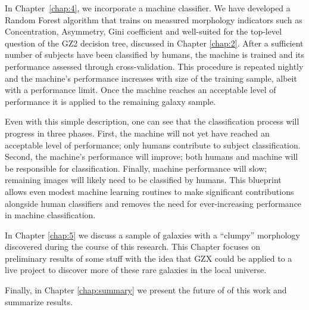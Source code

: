 In Chapter~\ref{chap:4}, we incorporate a machine classifier. We have developed a Random Forest algorithm that trains on measured morphology indicators such as Concentration, Asymmetry, Gini coefficient and  well-suited for the top-level question of the GZ2 decision tree, discussed in Chapter \ref{chap:2}. After a sufficient number of subjects have been classified by humans, the machine is trained and its performance assessed through cross-validation. This procedure is repeated nightly and the machine's performance increases with size of the training sample, albeit with a performance limit. Once the machine reaches an acceptable level of performance it is applied to the remaining galaxy sample. 

Even with this simple description, one can see that the classification process will progress in three phases.  First, the machine will not yet have reached an acceptable level of performance; only humans contribute to subject classification. Second, the machine's performance will improve; both humans and machine will be responsible for classification. Finally, machine performance will slow; remaining images will likely need to be classified by humans. This blueprint allows even modest machine learning routines to make significant contributions alongside human classifiers and removes the need for ever-increasing performance in machine classification.

In Chapter \ref{chap:5} we discuss a sample of galaxies with a ``clumpy'' morphology discovered during the course of this research. This Chapter focuses on preliminary results of some stuff with the idea that GZX could be applied to a live project to discover more of these rare galaxies in the local universe. 

Finally, in Chapter \ref{chap:summary} we present the future of of this work and summarize results. 